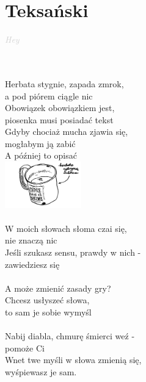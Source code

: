 \documentclass[a5paper, 10pt]{book}
\begin{document}
\section{Teksański}\textcolor{lightgray}{\textit{Hey}}\\~\\
\begin{minipage}[t]{0.7\textwidth}
~\\ %
Herbata stygnie, zapada zmrok,\\
a pod piórem ciągle nic\\
Obowiązek obowiązkiem jest,\\
piosenka musi posiadać tekst\\
Gdyby chociaż mucha zjawia się,\\
mogłabym ją zabić\\
A później to opisać\\
\includegraphics[height = 2cm,right]{teksanski.png}\vspace*{-2.1cm}\\
\\
W moich słowach słoma czai się,\\
nie znaczą nic\\
Jeśli szukasz sensu, prawdy w nich -\\
zawiedziesz się\\
\\
A może zmienić zasady gry?\\
Chcesz usłyszeć słowa,\\
to sam je sobie wymyśl\\
\\
Nabij diabla, chmurę śmierci weź -\\
pomoże Ci \\
Wnet twe myśli w słowa zmienią się,\\
wyśpiewasz je sam.\\

\end{minipage}
\end{document}
